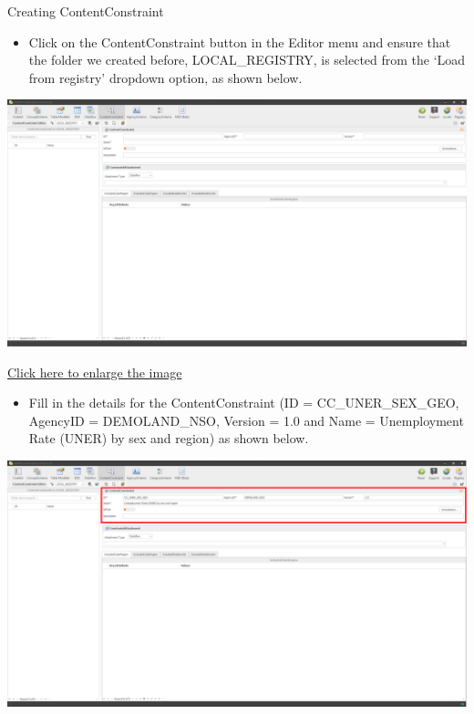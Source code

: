 \documentclass[
]{book}
\providecommand{\tightlist}{%
  \setlength{\itemsep}{0pt}\setlength{\parskip}{0pt}}
\begin{document}
Creating ContentConstraint

\begin{itemize}
\tightlist
\item
  Click on the ContentConstraint button in the Editor menu and ensure that the folder we created before, LOCAL\_REGISTRY, is selected from the `Load from registry' dropdown option, as shown below.
\end{itemize}

\begin{center}\includegraphics[width=1\linewidth]{./images/image271} \end{center}

\href{images/image271.png}{Click here to enlarge the image}

\begin{itemize}
\tightlist
\item
  Fill in the details for the ContentConstraint (ID = CC\_UNER\_SEX\_GEO, AgencyID = DEMOLAND\_NSO, Version = 1.0 and Name = Unemployment Rate (UNER) by sex and region) as shown below.
\end{itemize}

\begin{center}\includegraphics[width=1\linewidth]{./images/image272} \end{center}
\end{document}

